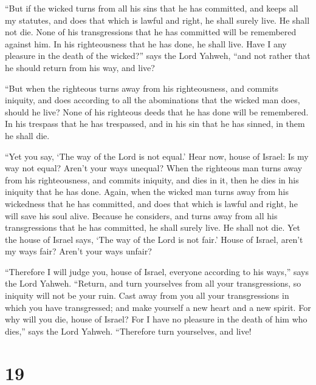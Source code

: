  ``But if the wicked turns from all his sins that he has
committed, and keeps all my statutes, and does that which is lawful and
right, he shall surely live. He shall not die.  None of his
transgressions that he has committed will be remembered against him. In
his righteousness that he has done, he shall live.  Have I
any pleasure in the death of the wicked?'' says the Lord Yahweh, ``and
not rather that he should return from his way, and live?

 ``But when the righteous turns away from his
righteousness, and commits iniquity, and does according to all the
abominations that the wicked man does, should he live? None of his
righteous deeds that he has done will be remembered. In his trespass
that he has trespassed, and in his sin that he has sinned, in them he
shall die.

 ``Yet you say, `The way of the Lord is not equal.' Hear
now, house of Israel: Is my way not equal? Aren't your ways unequal?
 When the righteous man turns away from his righteousness,
and commits iniquity, and dies in it, then he dies in his iniquity that
he has done.  Again, when the wicked man turns away from
his wickedness that he has committed, and does that which is lawful and
right, he will save his soul alive.  Because he considers,
and turns away from all his transgressions that he has committed, he
shall surely live. He shall not die.  Yet the house of
Israel says, `The way of the Lord is not fair.' House of Israel, aren't
my ways fair? Aren't your ways unfair?

 ``Therefore I will judge you, house of Israel, everyone
according to his ways,'' says the Lord Yahweh. ``Return, and turn
yourselves from all your transgressions, so iniquity will not be your
ruin.  Cast away from you all your transgressions in which
you have transgressed; and make yourself a new heart and a new spirit.
For why will you die, house of Israel?  For I have no
pleasure in the death of him who dies,'' says the Lord Yahweh.
``Therefore turn yourselves, and live!

\hypertarget{section-17}{%
\section{19}\label{section-17}}


